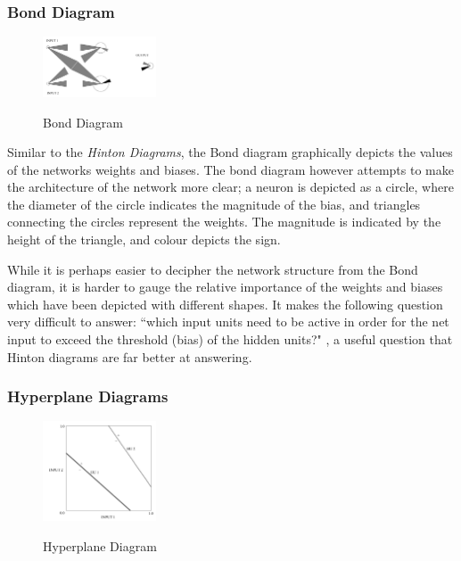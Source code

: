 \documentclass[a4paper,11pt,titlepage]{article}
\begin{document}
\subsubsection{Bond Diagram}		
 	\begin{figure}[H]
    			\centering	
			{{\includegraphics[width=0.3\textwidth]
    				{img/craven_bond.png} 
    			}}%
    			\caption{Bond Diagram}%
    		\label{fig:bond}
	\end{figure} 
 		
		Similar to the \textit{Hinton Diagrams}, the Bond diagram \cite{Wejchert1990} graphically depicts the values of the networks weights and biases. The bond diagram however attempts to make the architecture of the network more clear; a neuron is depicted as a circle, where the diameter of the circle indicates the magnitude of the bias, and triangles connecting the circles represent the weights. The magnitude is indicated by the height of the triangle, and colour depicts the sign. 
		\par 
		While it is perhaps easier to decipher the network structure from the Bond diagram, it is harder to gauge the relative importance of the weights and biases which have been depicted with different shapes. It makes the following question very difficult to answer: ``which input units need to be active in order for the net input to exceed the threshold (bias) of the hidden units?" \cite{Craven1992}, a useful question that Hinton diagrams are far better at answering.
		\par 
		
\subsubsection{Hyperplane Diagrams}
		
 	\begin{figure}[H]
    			\centering	
			{{\includegraphics[width=0.3\textwidth]
    				{img/craven_hyperplane.png} 
    			}}%
    			\caption{Hyperplane Diagram}%
    		\label{fig:bond}
	\end{figure} 
 		
\end{document}
